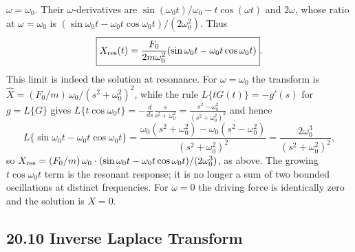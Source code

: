 $\omega=\omega_0$. Their $\omega$-derivatives are
$\sin(\omega_0t)/\omega_0-t\cos(\omega t)$ and $2\omega$, whose
ratio at $\omega=\omega_0$ is
$(\sin\omega_0t-\omega_0t\cos\omega_0t)/(2\omega_0^2)$. Thus
\[
\boxed{X_{\rm res}(t)=\frac{F_0}{2m\omega_0^2}
(\sin\omega_0t-\omega_0t\cos\omega_0t)}.
\]
This limit is indeed the solution at resonance. For
$\omega=\omega_0$ the transform is
$\widehat X=(F_0/m)\,\omega_0/(s^2+\omega_0^2)^2$, while the
rule $L\{tG(t)\}=-g'(s)$ for $g=L\{G\}$ gives
$L\{t\cos\omega_0t\}=-\frac d{ds}\frac s{s^2+\omega_0^2}
=\frac{s^2-\omega_0^2}{(s^2+\omega_0^2)^2}$ and hence
\[
L\{\sin\omega_0t-\omega_0t\cos\omega_0t\}
=\frac{\omega_0(s^2+\omega_0^2)-\omega_0(s^2-\omega_0^2)}
{(s^2+\omega_0^2)^2}
=\frac{2\omega_0^3}{(s^2+\omega_0^2)^2},
\]
so $X_{\rm res}=(F_0/m)\,\omega_0\cdot
(\sin\omega_0t-\omega_0t\cos\omega_0t)/(2\omega_0^3)$, as above.
The growing $t\cos\omega_0t$ term is the resonant response;
it is no longer a sum of two bounded oscillations at distinct
frequencies. For $\omega=0$ the driving force is identically
zero and the solution is $X=0$.

\subsection*{20.10 Inverse Laplace Transform}

